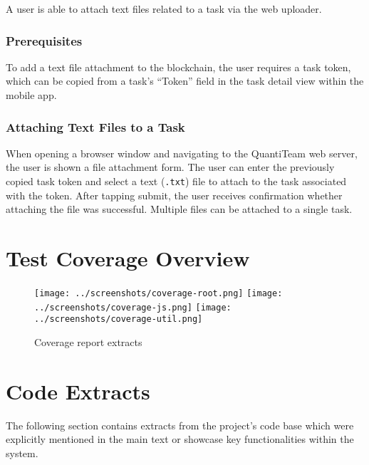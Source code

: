 A user is able to attach text files related to a task via the web
uploader.

\subsection{Prerequisites}\label{prerequisites}

To add a text file attachment to the blockchain, the user requires a
task token, which can be copied from a task's ``Token'' field in the
task detail view within the mobile app.

\subsection{Attaching Text Files to a
Task}\label{attaching-text-files-to-a-task}

When opening a browser window and navigating to the QuantiTeam web
server, the user is shown a file attachment form. The user can enter the
previously copied task token and select a text (\texttt{.txt}) file to
attach to the task associated with the token. After tapping submit, the
user receives confirmation whether attaching the file was successful.
Multiple files can be attached to a single task.


\chapter{Test Coverage Overview}

\begin{sidewaysfigure}[ht]
\centering
\texttt{[image: ../screenshots/coverage-root.png]}
\texttt{[image: ../screenshots/coverage-js.png]}
\texttt{[image: ../screenshots/coverage-util.png]}
\caption{Coverage report extracts}
\end{sidewaysfigure}


\chapter{Code Extracts}
The following section contains extracts from the project's code base which were explicitly mentioned in the main text or showcase key functionalities within the system.

